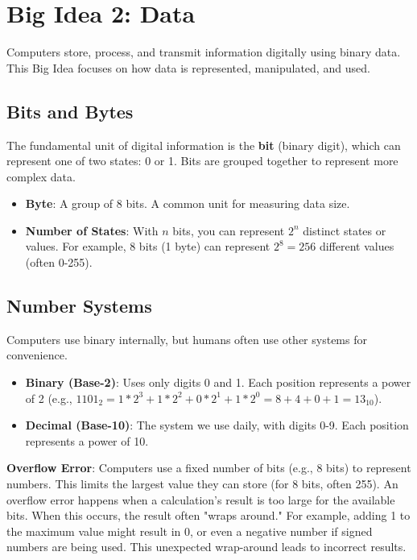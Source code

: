 \documentclass[11pt,oneside]{book}
\begin{document}
\chapter{Big Idea 2: Data}
\label{chap:data}
Computers store, process, and transmit information digitally using binary data. This Big Idea focuses on how data is represented, manipulated, and used.

\section{Bits and Bytes}
\label{sec:bits_bytes}
The fundamental unit of digital information is the \textbf{bit} (binary digit), which can represent one of two states: 0 or 1. Bits are grouped together to represent more complex data.
\begin{itemize}
    \item \textbf{Byte}: A group of 8 bits. A common unit for measuring data size.
    \item \textbf{Number of States}: With $n$ bits, you can represent $2^n$ distinct states or values. For example, 8 bits (1 byte) can represent $2^8 = 256$ different values (often 0-255).
\end{itemize}

\section{Number Systems}
\label{sec:number_systems}
Computers use binary internally, but humans often use other systems for convenience.
\begin{itemize}
    \item \textbf{Binary (Base-2)}: Uses only digits 0 and 1. Each position represents a power of 2 (e.g., $1101_2 = 1*2^3 + 1*2^2 + 0*2^1 + 1*2^0 = 8 + 4 + 0 + 1 = 13_{10}$).
    \item \textbf{Decimal (Base-10)}: The system we use daily, with digits 0-9. Each position represents a power of 10.
\end{itemize}

\textbf{Overflow Error}: Computers use a fixed number of bits (e.g., 8 bits) to represent numbers. This limits the largest value they can store (for 8 bits, often 255). An overflow error happens when a calculation's result is too large for the available bits. When this occurs, the result often "wraps around." For example, adding 1 to the maximum value might result in 0, or even a negative number if signed numbers are being used. This unexpected wrap-around leads to incorrect results.
\end{document}

